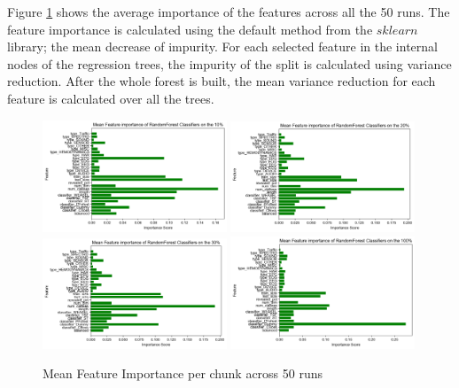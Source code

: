 Figure \ref{Img:MeanFeatureImportance} shows the average importance of the features across all the 50 runs.
The feature importance is calculated using the default method from the $sklearn$ library; the mean decrease of impurity.
For each selected feature in the internal nodes of the regression trees, the impurity of the split is calculated using variance reduction.
After the whole forest is built, the mean variance reduction for each feature is calculated over all the trees.

\begin{figure}[hbt!]
    \captionsetup{justification=raggedright}
    \includegraphics[width=0.49\textwidth,keepaspectratio]{mean_feature_imp_10pct.png}
    \includegraphics[width=0.49\textwidth,keepaspectratio]{mean_feature_imp_20pct.png}
    \\[\smallskipamount]
    \includegraphics[width=0.49\textwidth,keepaspectratio]{mean_feature_imp_30pct.png}
    \includegraphics[width=0.49\textwidth,keepaspectratio]{mean_feature_imp_100pct.png}
    \caption{Mean Feature Importance per chunk across 50 runs}
    \label{Img:MeanFeatureImportance}
\end{figure}

